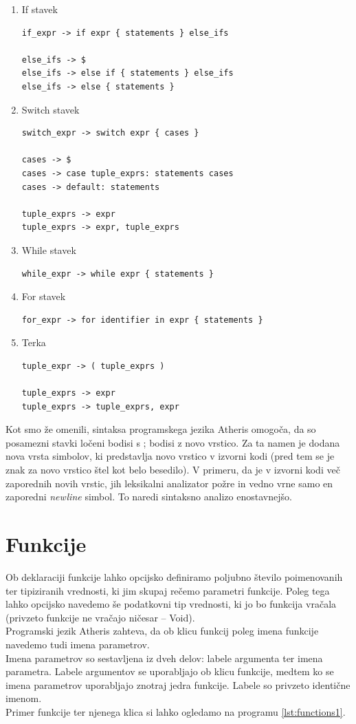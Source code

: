 \documentclass[a4paper, 12p]{book}
\begin{document}
\begin{enumerate}
	\item If stavek
\begin{lstlisting}[]
if_expr -> if expr { statements } else_ifs
			
else_ifs -> $
else_ifs -> else if { statements } else_ifs
else_ifs -> else { statements }
\end{lstlisting}
	\item Switch stavek
\begin{lstlisting}[]
switch_expr -> switch expr { cases }

cases -> $
cases -> case tuple_exprs: statements cases
cases -> default: statements

tuple_exprs -> expr
tuple_exprs -> expr, tuple_exprs
\end{lstlisting}
	\item While stavek
\begin{lstlisting}[]
while_expr -> while expr { statements }
\end{lstlisting}
	\item For stavek
\begin{lstlisting}[]
for_expr -> for identifier in expr { statements }
\end{lstlisting}
	\item Terka
\begin{lstlisting}
tuple_expr -> ( tuple_exprs )

tuple_exprs -> expr
tuple_exprs -> tuple_exprs, expr
\end{lstlisting}
\end{enumerate} 

Kot smo že omenili, sintaksa programskega jezika Atheris omogoča, da so posamezni stavki ločeni bodisi s {\ttfamily ;} bodisi z novo vrstico. Za ta namen je dodana nova vrsta simbolov, ki predstavlja novo vrstico v izvorni kodi (pred tem se je znak za novo vrstico štel kot belo besedilo). V primeru, da je v izvorni kodi več zaporednih novih vrstic, jih leksikalni analizator požre in vedno vrne samo en zaporedni \textit{newline} simbol. To naredi sintaksno analizo enostavnejšo. 

\section{Funkcije}

Ob deklaraciji funkcije lahko opcijsko definiramo poljubno število poimenovanih ter tipiziranih vrednosti, ki jim skupaj rečemo parametri funkcije. Poleg tega lahko opcijsko navedemo še podatkovni tip vrednosti, ki jo bo funkcija vračala (privzeto funkcije ne vračajo ničesar – {\ttfamily Void}).\\
\indent Programski jezik Atheris zahteva, da ob klicu funkcij poleg imena funkcije navedemo tudi imena parametrov. \\
\indent Imena parametrov so sestavljena iz dveh delov: labele argumenta ter imena parametra. Labele argumentov se uporabljajo ob klicu funkcije, medtem ko se imena parametrov uporabljajo znotraj jedra funkcije. Labele so privzeto identične imenom. \\\indent Primer funkcije ter njenega klica si lahko ogledamo na programu \ref{lst:functions1}.
\end{document}
